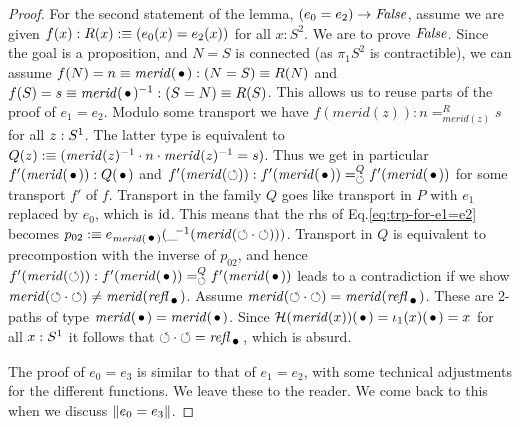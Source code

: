 \documentclass[english,a4]{article}
\newcommand{\Sp}{{S^2}}%
\newcommand{\mrd}{\mathit{merid}}%
\begin{document}
\begin{proof}
For the second statement of the lemma, $(e_0 = e_2)\to\mathop{\mathit{False}}$,
assume we are given $f(x):R(x)\mathrel{\hbox{:}\mkern-5mu\equiv}(e_0(x)=e_2(x))$ for all $x:\Sp$.
We are to prove $\mathop{\mathit{False}}$. Since the goal is a proposition,
and $N=S$ is connected (as $\pi_1 \Sp$ is contractible),
we can assume $f(N)=n\jdeq\mrd(\base):(N=S)\jdeq R(N)$ and 
$f(S)=s\jdeq\mrd(\base)^{-1}:(S=N)\jdeq R(S)$.
This allows us to reuse parts of the proof of $e_1 = e_2$.
Modulo some transport we have $f(\mrd(z)): n=^R_{\mrd(z)}s$
for all $z:{S^1}$. The latter type is equivalent to
$Q(z)\defeq(\mrd(z)^{-1}\cdot n\cdot \mrd(z)^{-1} = s)$.
Thus we get in particular $f'(\mrd(\base)): Q(\base)$ and 
$f'(\mrd(\Sloop)): f'(\mrd(\base))=^Q_{\Sloop}f'(\mrd(\base))$
for some transport $f'$ of $f$.
Transport in the family $Q$ goes like transport in $P$ with $e_1$
replaced by $e_0$, which is $\mathord{\mathrm{id}}$. 
This means that the rhs of Eq.\ref{eq:trp-for-e1=e2} becomes
$p_{02}\defeq e_{\mrd(\base)}(\_\!^{-1}(\mrd(\Sloop\cdot\Sloop)))$.
Transport in $Q$ is equivalent to precompostion with the inverse of $p_{02}$,
and hence $f'(\mrd(\Sloop)): f'(\mrd(\base))=^Q_{\Sloop}f'(\mrd(\base))$
leads to a contradiction if we show
$\mrd(\Sloop\cdot\Sloop) \neq \mrd(\refl{\base})$.
Assume $\mrd(\Sloop\cdot\Sloop) = \mrd(\refl{\base})$.
These are 2-paths of type $\mrd(\base)=\mrd(\base)$.
Since $\hopffam(\mrd(x))(\base) = \iota_1(x)(\base) = x$ for all $x:{S^1}$
it follows that $\Sloop\cdot\Sloop = \refl{\base}$, which is absurd.

The proof of $e_0 = e_3$ is similar to that of $e_1 = e_2$, with some
technical adjustments for the different functions. We leave these to the
reader. We come back to this when we discuss $\lVert e_0 = e_3\rVert$.
\end{proof}
\end{document}
